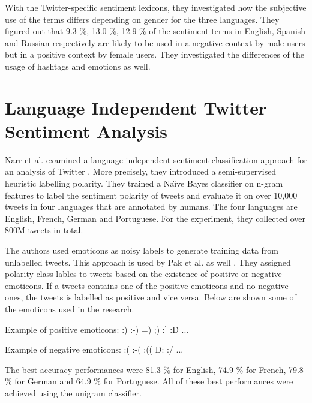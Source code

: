 With the Twitter-specific sentiment lexicons, they investigated how the subjective use of the terms differs depending on gender for the three languages.
They figured out that 9.3 \%, 13.0 \%, 12.9 \% of the sentiment terms in English, Spanish and Russian respectively are likely to be used in a negative context by male users but in a positive context by female users.
They investigated the differences of the usage of hashtags and emotions as well.



\section{Language Independent Twitter Sentiment Analysis}
Narr et al. examined a language-independent sentiment classification approach for an analysis of Twitter \cite{dataset}.
More precisely, they introduced a semi-supervised heuristic labelling polarity.
They trained a Na\"\i ve Bayes classifier on n-gram features to label the sentiment polarity of tweets and evaluate it on over 10,000 tweets in four languages that are annotated by humans.
The four languages are English, French, German and Portuguese.
For the experiment, they collected over 800M tweets in total.

The authors used emoticons as noisy labels to generate training data from unlabelled tweets.
This approach is used by Pak et al. as well \cite{pak}.
They assigned polarity class lables to tweets based on the existence of positive or negative emoticons.
If a tweets contains one of the positive emoticons and no negative ones, the tweets is labelled as positive and vice versa.
Below are shown some of the emoticons used in the research.

Example of positive emoticons:
:) :-) =) ;) :] :D ...

Example of negative emoticons:
:( :-( :(( D: :/ ...

The best accuracy performances were 81.3 \% for English, 74.9 \% for French, 79.8 \% for German and 64.9 \% for Portuguese.
All of these best performances were achieved using the unigram classifier.

